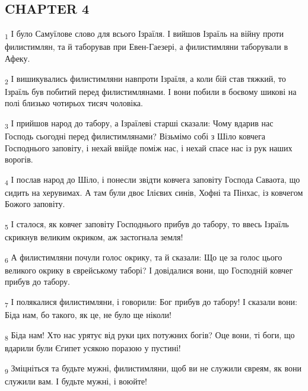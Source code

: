 \subsection{CHAPTER 4}
\begin{tcolorbox}
\textsubscript{1} І було Самуїлове слово для всього Ізраїля. І вийшов Ізраїль на війну проти филистимлян, та й таборував при Евен-Гаезері, а филистимляни таборували в Афеку.
\end{tcolorbox}
\begin{tcolorbox}
\textsubscript{2} І вишикувались филистимляни навпроти Ізраїля, а коли бій став тяжкий, то Ізраїль був побитий перед филистимлянами. І вони побили в боєвому шикові на полі близько чотирьох тисяч чоловіка.
\end{tcolorbox}
\begin{tcolorbox}
\textsubscript{3} І прийшов народ до табору, а Ізраїлеві старші сказали: Чому вдарив нас Господь сьогодні перед филистимлянами? Візьмімо собі з Шіло ковчега Господнього заповіту, і нехай ввійде поміж нас, і нехай спасе нас із рук наших ворогів.
\end{tcolorbox}
\begin{tcolorbox}
\textsubscript{4} І послав народ до Шіло, і понесли звідти ковчега заповіту Господа Саваота, що сидить на херувимах. А там були двоє Ілієвих синів, Хофні та Пінхас, із ковчегом Божого заповіту.
\end{tcolorbox}
\begin{tcolorbox}
\textsubscript{5} І сталося, як ковчег заповіту Господнього прибув до табору, то ввесь Ізраїль скрикнув великим окриком, аж застогнала земля!
\end{tcolorbox}
\begin{tcolorbox}
\textsubscript{6} А филистимляни почули голос окрику, та й сказали: Що це за голос цього великого окрику в єврейському таборі? І довідалися вони, що Господній ковчег прибув до табору.
\end{tcolorbox}
\begin{tcolorbox}
\textsubscript{7} І полякалися филистимляни, і говорили: Бог прибув до табору! І сказали вони: Біда нам, бо такого, як це, не було ще ніколи!
\end{tcolorbox}
\begin{tcolorbox}
\textsubscript{8} Біда нам! Хто нас урятує від руки цих потужних богів? Оце вони, ті боги, що вдарили були Єгипет усякою поразою у пустині!
\end{tcolorbox}
\begin{tcolorbox}
\textsubscript{9} Зміцніться та будьте мужні, филистимляни, щоб ви не служили євреям, як вони служили вам. І будьте мужні, і воюйте!
\end{tcolorbox}
